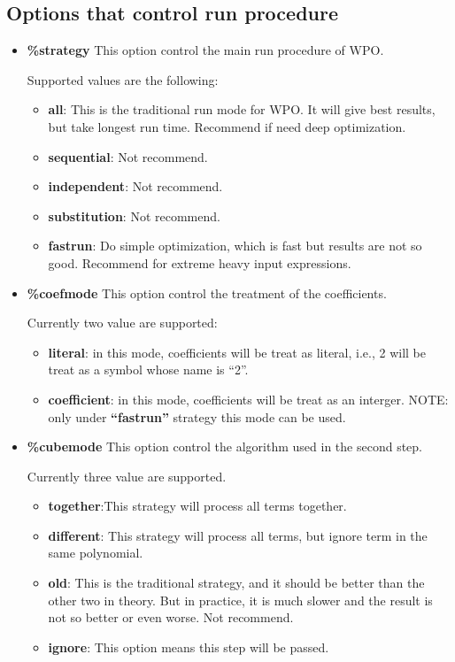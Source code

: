 \documentclass[a4paper]{article}
\begin{document}
\subsection{Options that control run procedure}
\begin{itemize}
\item \textbf{\%strategy}
This option control the main run procedure of WPO.

Supported values are the following:
\begin{itemize}
\item \textbf{all}: This is the traditional run mode for WPO. It will give best results, but take longest run time. Recommend if need deep optimization.
\item \textbf{sequential}: Not recommend.
\item \textbf{independent}: Not recommend.
\item \textbf{substitution}: Not recommend.
\item \textbf{fastrun}: Do simple optimization, which is fast but results are not so good. Recommend for extreme heavy input expressions.
\end{itemize}

\item \textbf{\%coefmode}
This option control the treatment of the coefficients.

Currently two value are supported:
\begin{itemize}
\item \textbf{literal}: in this mode, coefficients will be treat as literal, i.e., 2 will be treat as a symbol whose name is ``2''.
\item \textbf{coefficient}: in this mode, coefficients will be treat as an interger.
NOTE: only under \textbf{``fastrun''} strategy this mode can be used.
\end{itemize}

\item \textbf{\%cubemode}
This option control the algorithm used in the second step.

Currently three value are supported.
\begin{itemize}
\item \textbf{together}:This strategy will process all terms together.
\item \textbf{different}: This strategy will process all terms, but ignore term in the same polynomial.
\item \textbf{old}: This is the traditional strategy, and it should be better than the other two in theory. But in practice, it is much slower and the result is not so better or even worse. Not recommend.
\item \textbf{ignore}: This option means this step will be passed.
\end{itemize}


\end{itemize}
\end{document}
